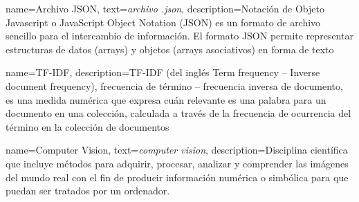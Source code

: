 {
        name={Archivo JSON},
        text={\textit{archivo .json}},
        description={Notación de Objeto Javascript o JavaScript Object Notation (JSON) es un formato de archivo sencillo para el intercambio de información. El formato JSON permite representar estructuras de datos (arrays) y objetos (arrays asociativos) en forma de texto}
}

{
        name={TF-IDF},
        description={TF-IDF (del inglés Term frequency – Inverse document frequency), frecuencia de término – frecuencia inversa de documento, es una medida numérica que expresa cuán relevante es una palabra para un documento en una colección, calculada a través de la frecuencia de ocurrencia del término en la colección de documentos}
}

{
        name={Computer Vision},
        text={\textit{computer vision}},
        description={Disciplina científica que incluye métodos para adquirir, procesar, analizar y comprender las imágenes del mundo real con el fin de producir información numérica o simbólica para que puedan ser tratados por un ordenador.}
}

